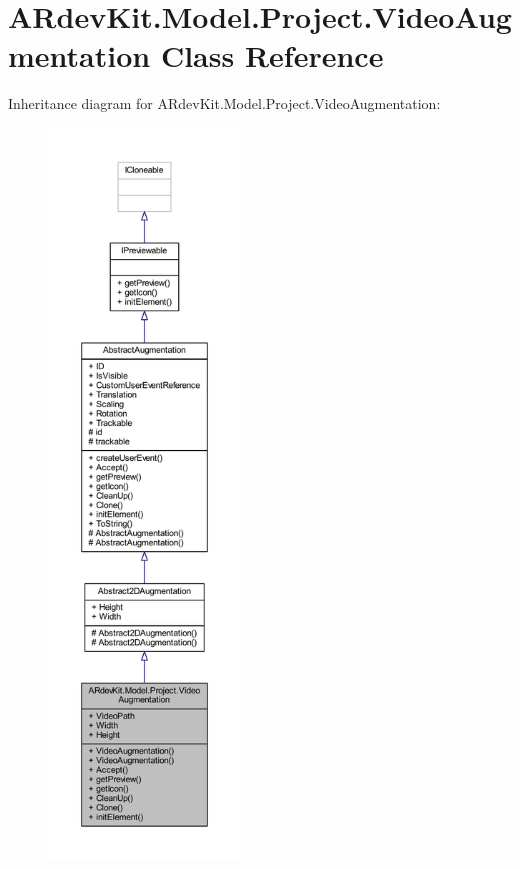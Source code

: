 \hypertarget{class_a_rdev_kit_1_1_model_1_1_project_1_1_video_augmentation}{\section{A\-Rdev\-Kit.\-Model.\-Project.\-Video\-Augmentation Class Reference}
\label{class_a_rdev_kit_1_1_model_1_1_project_1_1_video_augmentation}
}


Inheritance diagram for A\-Rdev\-Kit.\-Model.\-Project.\-Video\-Augmentation\-:
\nopagebreak
\begin{figure}[H]
\begin{center}
\leavevmode
\includegraphics[height=550pt]{class_a_rdev_kit_1_1_model_1_1_project_1_1_video_augmentation__inherit__graph}
\end{center}
\end{figure}


